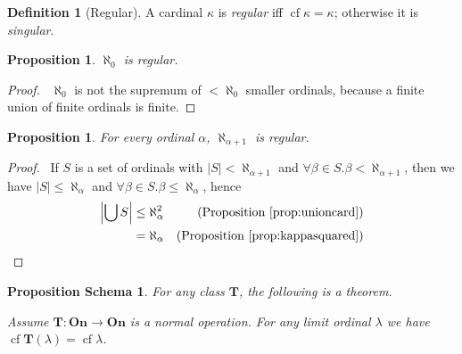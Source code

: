 \documentclass{book}
\let\qed\relax
\newtheorem{prop}[ax]{Proposition}
\newtheorem{props}[ax]{Proposition Schema}
\theoremstyle{definition}
\newtheorem{df}[ax]{Definition}
\newcommand{\cf}{\ensuremath{\operatorname{cf}}}
\begin{document}
\begin{df}[Regular]
A cardinal $\kappa$ is \emph{regular} iff $\cf \kappa = \kappa$; otherwise it is \emph{singular}.
\end{df}

\begin{prop}
$\aleph_0$ is regular.
\end{prop}

\begin{proof}
\pf\ $\aleph_0$ is not the supremum of $< \aleph_0$ smaller ordinals, because a finite union of finite ordinals is finite. \qed
\end{proof}

\begin{prop}
For every ordinal $\alpha$, $\aleph_{\alpha + 1}$ is regular.
\end{prop}

\begin{proof}
\pf\ If $S$ is a set of ordinals with $|S| < \aleph_{\alpha + 1}$ and $\forall \beta \in S. \beta < \aleph_{\alpha + 1}$, then we have $|S| \leq \aleph_\alpha$ and $\forall \beta \in S. \beta \leq \aleph_\alpha$, hence
\begin{align*}
\left|\bigcup S\right| & \leq \aleph_{\alpha}^2 & (\text{Proposition \ref{prop:unioncard}}) \\
& = \aleph_{\alpha} & (\text{Proposition \ref{prop:kappasquared}}) \qed
\end{align*}
\end{proof}

\begin{props}
For any class $\mathbf{T}$, the following is a theorem.

Assume $\mathbf{T} : \mathbf{On} \rightarrow \mathbf{On}$ is a normal operation.
For any limit ordinal $\lambda$ we have $\cf \mathbf{T}(\lambda) = \cf \lambda$.
\end{props}
\end{document}
